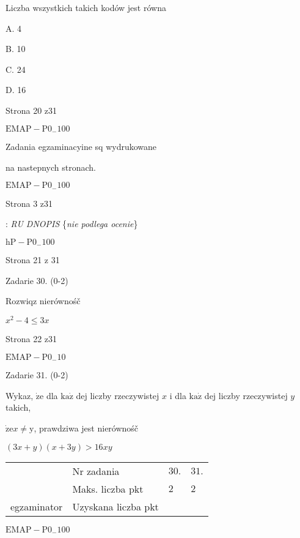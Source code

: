 \documentclass[a4paper,12pt]{article}
\begin{document}
Liczba wszystkich takich kodów jest równa

A. 4

B. 10

C. 24

D. 16

Strona 20 z31

$\mathrm{E}\mathrm{M}\mathrm{A}\mathrm{P}-\mathrm{P}0_{-}100$





Zadania egzaminacyine sq wydrukowane

na nastepnych stronach.

$\mathrm{E}\mathrm{M}\mathrm{A}\mathrm{P}-\mathrm{P}0_{-}100$

Strona 3 z31





: {\it RU DNOPIS} \{{\it nie podlega ocenie}\}

$\mathrm{h}\mathrm{P}-\mathrm{P}0_{-}100$

Strona 21 z 31





Zadarie 30. (0-2)

Rozwiqz nierównośč

$x^{2}-4\leq 3x$

Strona 22 z31

$\mathrm{E}\mathrm{M}\mathrm{A}\mathrm{P}-\mathrm{P}0_{-}10$





Zadarie 31. (0-2)

Wykaz, $\dot{\mathrm{z}}\mathrm{e}$ dla $\mathrm{k}\mathrm{a}\dot{\mathrm{z}}$ dej liczby rzeczywistej $x$ i dla $\mathrm{k}\mathrm{a}\dot{\mathrm{z}}$ dej liczby rzeczywistej $y$ takich,

$\dot{\mathrm{z}}\mathrm{e} x\neq \mathrm{y}$, prawdziwa jest nierównośč

$(3x+y)(x+3y)>16xy$
\begin{center}
\begin{tabular}{|l|l|l|l|}
\cline{2-4}
&	\multicolumn{1}{|l|}{Nr zadania}&	\multicolumn{1}{|l|}{$30.$}&	\multicolumn{1}{|l|}{ $31.$}	\\
\cline{2-4}
&	\multicolumn{1}{|l|}{Maks. liczba pkt}&	\multicolumn{1}{|l|}{$2$}&	\multicolumn{1}{|l|}{ $2$}	\\
\cline{2-4}
\multicolumn{1}{|l|}{egzaminator}&	\multicolumn{1}{|l|}{Uzyskana liczba pkt}&	\multicolumn{1}{|l|}{}&	\multicolumn{1}{|l|}{}	\\
\hline
\end{tabular}

\end{center}
$\mathrm{E}\mathrm{M}\mathrm{A}\mathrm{P}-\mathrm{P}0_{-}100$
\end{document}

